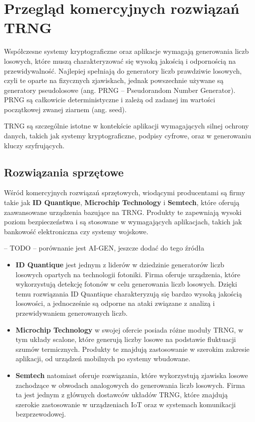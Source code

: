 \section{Przegląd komercyjnych rozwiązań TRNG}\label{sec:przeglad-komercyjnych-rozwiazan-trng}

Współczesne systemy kryptograficzne oraz aplikacje wymagają generowania liczb losowych,
które muszą charakteryzować się wysoką jakością i odpornością na przewidywalność.
Najlepiej spełniają do generatory liczb prawdziwie losowych, czyli te oparte na fizycznych zjawiskach,
jednak powszechnie używane są generatory pseudolosowe (ang. PRNG -- Pseudorandom Number Generator).
PRNG są całkowicie deterministyczne i zależą od zadanej im wartości początkowej zwanej ziarnem (ang. seed).

TRNG są szczególnie istotne w kontekście aplikacji wymagających silnej ochrony danych,
takich jak systemy kryptograficzne, podpisy cyfrowe, oraz w generowaniu kluczy szyfrujących.

\subsection{Rozwiązania sprzętowe}\label{subsec:rozwiazania-sprzetowe}

Wśród komercyjnych rozwiązań sprzętowych, wiodącymi producentami są firmy takie jak
\textbf{ID Quantique}, \textbf{Microchip Technology} i \textbf{Semtech},
które oferują zaawansowane urządzenia bazujące na TRNG.
Produkty te zapewniają wysoki poziom bezpieczeństwa i są stosowane w wymagających aplikacjach,
takich jak bankowość elektroniczna czy systemy wojskowe.

-- TODO --
porównanie jest AI-GEN, jeszcze dodać do tego źródła
\begin{itemize}
    \item \textbf{ID Quantique} jest jednym z liderów w dziedzinie generatorów liczb losowych opartych na technologii fotoniki.
     Firma oferuje urządzenia, które wykorzystują detekcję fotonów w celu generowania liczb losowych.
     Dzięki temu rozwiązania ID Quantique charakteryzują się bardzo wysoką jakością losowości,
     a jednocześnie są odporne na ataki związane z analizą i przewidywaniem generowanych liczb.

    \item \textbf{Microchip Technology} w swojej ofercie posiada różne moduły TRNG, w tym układy scalone,
     które generują liczby losowe na podstawie fluktuacji szumów termicznych.
    Produkty te znajdują zastosowanie w szerokim zakresie aplikacji, od urządzeń mobilnych po systemy wbudowane.

    \item \textbf{Semtech} natomiast oferuje rozwiązania, które wykorzystują zjawiska losowe
     zachodzące w obwodach analogowych do generowania liczb losowych.
     Firma ta jest jednym z głównych dostawców układów TRNG,
     które znajdują szerokie zastosowanie w urządzeniach IoT oraz w systemach komunikacji bezprzewodowej.
\end{itemize}

